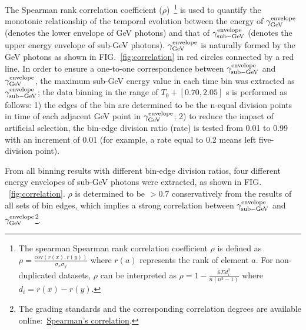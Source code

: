 \documentclass[prd,twocolumn,amsmath,amssymb,aps,linenumbers]{revtex4-2} %
\providecommand{\DIFaddtex}[1]{{\protect\color{blue} \sf #1}} %
\providecommand{\DIFdeltex}[1]{{\protect\color{red} \scriptsize #1}} %
\providecommand{\DIFaddbegin}{} %
\providecommand{\DIFaddend}{} %
\providecommand{\DIFdelbegin}{} %
\providecommand{\DIFdelend}{} %
\providecommand{\DIFadd}[1]{\texorpdfstring{\DIFaddtex{#1}}{#1}} %
\providecommand{\DIFdel}[1]{\texorpdfstring{\DIFdeltex{#1}}{}} %
\newcommand{\DIFscaledelfig}{0.5}
\newlength{\DIFdelgraphicswidth} %
\newlength{\DIFdelgraphicsheight} %
\newcommand{\DIFaddincludegraphics}[2][]{{\color{blue}\fbox{\DIFOincludegraphics[#1]{#2}}}} %
\newcommand{\DIFdelincludegraphics}[2][]{%
\sbox{\DIFdelgraphicsbox}{\DIFOincludegraphics[#1]{#2}}%
\settoboxwidth{\DIFdelgraphicswidth}{\DIFdelgraphicsbox} %
\settoboxtotalheight{\DIFdelgraphicsheight}{\DIFdelgraphicsbox} %
\scalebox{\DIFscaledelfig}{%
\parbox[b]{\DIFdelgraphicswidth}{\usebox{\DIFdelgraphicsbox}\\[-\baselineskip] \rule{\DIFdelgraphicswidth}{0em}}\llap{\resizebox{\DIFdelgraphicswidth}{\DIFdelgraphicsheight}{%
\setlength{\unitlength}{\DIFdelgraphicswidth}%
\begin{picture}(1,1)%
\thicklines\linethickness{2pt} %
{\color[rgb]{1,0,0}\put(0,0){\framebox(1,1){}}}%
{\color[rgb]{1,0,0}\put(0,0){\line( 1,1){1}}}%
{\color[rgb]{1,0,0}\put(0,1){\line(1,-1){1}}}%
\end{picture}%
}\hspace*{3pt}}} %
} %
\DeclareRobustCommand{\DIFaddbegin}{\DIFOaddbegin \let\includegraphics\DIFaddincludegraphics} %
\DeclareRobustCommand{\DIFaddend}{\DIFOaddend \let\includegraphics\DIFOincludegraphics} %
\DeclareRobustCommand{\DIFdelbegin}{\DIFOdelbegin \let\includegraphics\DIFdelincludegraphics} %
\DeclareRobustCommand{\DIFdelend}{\DIFOaddend \let\includegraphics\DIFOincludegraphics} %
\begin{document}
The Spearman rank correlation coefficient ($\rho$)~\citep{spearman}\footnote{The \DIFdelbegin \DIFdel{spearman }\DIFdelend \DIFaddbegin \DIFadd{Spearman }\DIFaddend rank correlation coefficient $\rho$ is defined as $\rho = \frac{\mathrm{cov}(r(x),r(y))}{\sigma_x \sigma_y} $ where $r(a)$ represents the rank of element $a$. For non-duplicated datasets, $\rho$ can be interpreted as $\rho = 1 - \frac{6 \Sigma d^2_i}{n(n^2-1)} $ where $d_i = r(x) - r(y)$.} is used to quantify the monotonic relationship of the temporal evolution between the energy of $\gamma^{\rm envelope}_{\rm GeV}$ (denotes the lower envelope of GeV photons) and that of $\gamma^{\rm envelope}_{\rm sub-GeV}$ (denotes the upper energy envelope of sub-GeV photons). $\gamma^{\rm envelope}_{\rm GeV}$ is naturally formed by the GeV photons as shown in FIG.~\ref{fig:correlation} in red circles connected by a red line.
In order to ensure a one-to-one correspondence between $\gamma^{\rm envelope}_{\rm sub-GeV}$ and $\gamma^{\rm envelope}_{\rm GeV}$, the maximum sub-GeV energy value in each time bin was extracted as $\gamma^{\rm envelope}_{\rm sub-GeV}$; the data binning in the range of $T_0+[0.70, 2.05]$ s is performed as follows: 1) the edges of the bin are determined to be the n-equal division points in time of each adjacent GeV point in $\gamma^{\rm envelope}_{\rm GeV}$; 2) to reduce the impact of artificial selection, the bin-edge division ratio (rate) is tested from 0.01 to 0.99 with an increment of 0.01 (for example, a rate equal to 0.2 means left five-division point). 

From all binning results with different bin-edge division ratios, four different energy envelopes of sub-GeV photons were extracted, as shown in FIG.\DIFaddbegin \DIFadd{~}\DIFaddend \ref{fig:correlation}. $\rho$ is determined to be $> 0.7$ conservatively from \DIFaddbegin \DIFadd{the }\DIFaddend results of all sets of bin edges, which implies a strong correlation between $\gamma^{\rm envelope}_{\rm sub-GeV}$ and $\gamma^{\rm envelope}_{\rm GeV}$\footnote{The grading standards and the corresponding correlation degrees are available online:~\href{https://www.statstutor.ac.uk/resources/uploaded/spearmans.pdf}{Spearman's correlation}. }.
\end{document}
